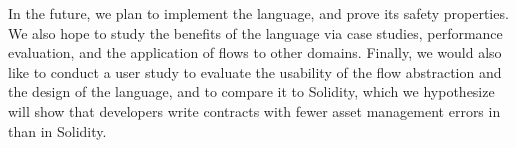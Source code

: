 \documentclass[nonacm, dvipsnames, sigconf]{acmart}
\begin{document}
In the future, we plan to implement the \langName language, and prove its safety properties.
We also hope to study the benefits of the language via case studies, performance evaluation, and the application of flows to other domains.
Finally, we would also like to conduct a user study to evaluate the usability of the flow abstraction and the design of the language, and to compare it to Solidity, which we hypothesize will show that developers write contracts with fewer asset management errors in \langName than in Solidity.



\end{document}
